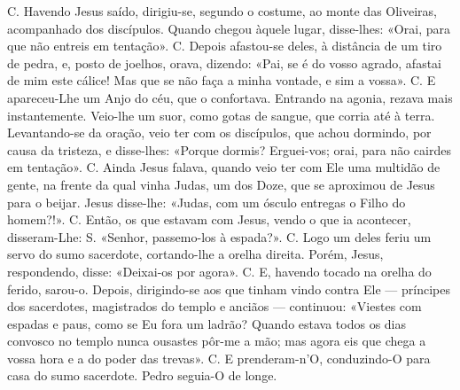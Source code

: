 \begin{paracol}{2}
{{\redx C.} Havendo Jesus saído, dirigiu-se, segundo o costume, ao monte das Oliveiras, acompanhado dos discípulos. Quando chegou àquele lugar, disse-lhes: \cruz «Orai, para que não entreis em tentação». {\redx C.} Depois afastou-se deles, à distância de um tiro de pedra, e, posto de joelhos, orava, dizendo: \cruz «Pai, se é do vosso agrado, afastai de mim este cálice! Mas que se não faça a minha vontade, e sim a vossa». {\redx C.} E apareceu-Lhe um Anjo do céu, que o confortava. Entrando na agonia, rezava mais instantemente. Veio-lhe um suor, como gotas de sangue, que corria até à terra. Levantando-se da oração, veio ter com os discípulos, que achou dormindo, por causa da tristeza, e disse-lhes: «Porque dormis? Erguei-vos; orai, para não cairdes em tentação». {\redx C.} Ainda Jesus falava, quando veio ter com Ele uma multidão de gente, na frente da qual vinha Judas, um dos Doze, que se aproximou de Jesus para o beijar. Jesus disse-lhe: \cruz «Judas, com um ósculo entregas o Filho do homem?!». {\redx C.} Então, os que estavam com Jesus, vendo o que ia acontecer, disseram-Lhe: {\redx S.} «Senhor, passemo-los à espada?». {\redx C.} Logo um deles feriu um servo do sumo sacerdote, cortando-lhe a orelha direita. Porém, Jesus, respondendo, disse: \cruz «Deixai-os por agora». {\redx C.} E, havendo tocado na orelha do ferido, sarou-o. Depois, dirigindo-se aos que tinham vindo contra Ele — príncipes dos sacerdotes, magistrados do templo e anciãos — continuou: \cruz «Viestes com espadas e paus, como se Eu fora um ladrão? Quando estava todos os dias convosco no templo nunca ousastes pôr-me a mão; mas agora eis que chega a vossa hora e a do poder das trevas». {\redx C.} E prenderam-n’O, conduzindo-O para casa do sumo sacerdote. Pedro seguia-O de longe.
}\switchcolumn*{}
\end{paracol}
